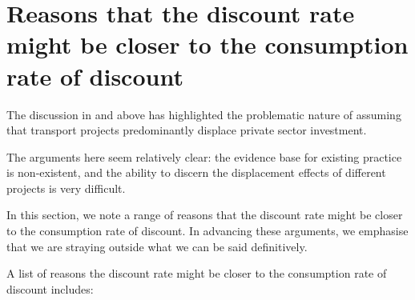 \section{Reasons that the discount rate might be closer to the consumption rate of discount}\label{section:downside-pressures-on-a-weighted-discount-rate}

The discussion in  and  above has highlighted the problematic nature of assuming that transport projects predominantly displace private sector investment. 

The arguments here seem relatively clear: the evidence base for existing practice is non-existent, and the ability to discern the displacement effects of different projects is very difficult. 

In this section, we note a range of reasons that the discount rate might be closer to the consumption rate of discount. In advancing these arguments, we emphasise that we are straying outside what we can be said definitively. 

A list of reasons the discount rate might be closer to the consumption rate of discount includes:

